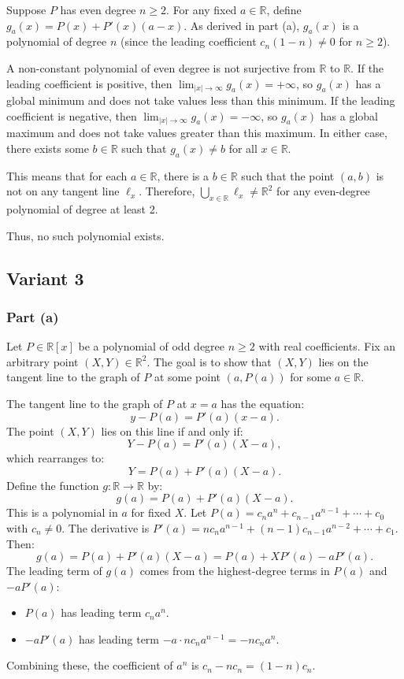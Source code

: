 \documentclass[12pt,a4paper]{article}
\theoremstyle{definition}
\begin{document}
Suppose $P$ has even degree $n \geq 2$. For any fixed $a \in \mathbb{R}$, define $g_a(x) = P(x) + P'(x)(a - x)$. As derived in part (a), $g_a(x)$ is a polynomial of degree $n$ (since the leading coefficient $c_n (1 - n) \neq 0$ for $n \geq 2$).

A non-constant polynomial of even degree is not surjective from $\mathbb{R}$ to $\mathbb{R}$. If the leading coefficient is positive, then $\lim_{|x| \to \infty} g_a(x) = +\infty$, so $g_a(x)$ has a global minimum and does not take values less than this minimum. If the leading coefficient is negative, then $\lim_{|x| \to \infty} g_a(x) = -\infty$, so $g_a(x)$ has a global maximum and does not take values greater than this maximum. In either case, there exists some $b \in \mathbb{R}$ such that $g_a(x) \neq b$ for all $x \in \mathbb{R}$.

This means that for each $a \in \mathbb{R}$, there is a $b \in \mathbb{R}$ such that the point $(a, b)$ is not on any tangent line $\ell_x$. Therefore, $\bigcup_{x \in \mathbb{R}} \ell_x \neq \mathbb{R}^2$ for any even-degree polynomial of degree at least 2.

Thus, no such polynomial exists.

    \subsection{Variant 3}

    \subsubsection*{Part (a)}
    Let $P \in \mathbb{R}[x]$ be a polynomial of odd degree $n \geq 2$ with real coefficients. Fix an arbitrary point $(X, Y) \in \mathbb{R}^2$. The goal is to show that $(X, Y)$ lies on the tangent line to the graph of $P$ at some point $(a, P(a))$ for some $a \in \mathbb{R}$.

    The tangent line to the graph of $P$ at $x = a$ has the equation:
    \[
        y - P(a) = P'(a)(x - a).
    \]
    The point $(X, Y)$ lies on this line if and only if:
    \[
        Y - P(a) = P'(a)(X - a),
    \]
    which rearranges to:
    \[
        Y = P(a) + P'(a)(X - a).
    \]
    Define the function $g: \mathbb{R} \to \mathbb{R}$ by:
    \[
        g(a) = P(a) + P'(a)(X - a).
    \]
    This is a polynomial in $a$ for fixed $X$. Let $P(a) = c_n a^n + c_{n-1} a^{n-1} + \cdots + c_0$ with $c_n \neq 0$. The derivative is $P'(a) = n c_n a^{n-1} + (n-1) c_{n-1} a^{n-2} + \cdots + c_1$. Then:
    \[
        g(a) = P(a) + P'(a)(X - a) = P(a) + X P'(a) - a P'(a).
    \]
    The leading term of $g(a)$ comes from the highest-degree terms in $P(a)$ and $-a P'(a)$:
    \begin{itemize}
        \item $P(a)$ has leading term $c_n a^n$.
        \item $-a P'(a)$ has leading term $-a \cdot n c_n a^{n-1} = -n c_n a^n$.
    \end{itemize}
    Combining these, the coefficient of $a^n$ is $c_n - n c_n = (1 - n) c_n$.
\end{document}
